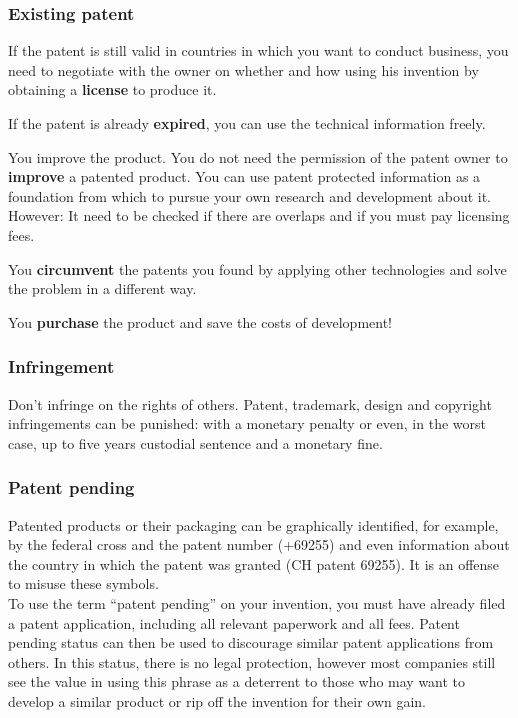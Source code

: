 \subsubsection{Existing patent}
\begin{compactitem}
	\item If the patent is still valid in countries in which you want to conduct business, you need to negotiate with the owner on whether and how using his invention by obtaining a \textbf{license} to produce it.
	\item If the patent is already \textbf{expired}, you can use the technical information freely.
	\item You improve the product. You do not need the permission of the patent
	owner to \textbf{improve} a patented product. You can use patent protected information as a foundation from which to pursue your own research and development about it. However: It need to be checked if there are overlaps and if you must pay licensing fees.
	\item You \textbf{circumvent} the patents you found by applying other technologies and solve the problem in a different way.
	\item You \textbf{purchase} the product and save the costs of development!
\end{compactitem}

\subsubsection{Infringement}
Don’t infringe on the rights of others. Patent, trademark, design and copyright infringements can be punished: with a monetary penalty or even, in the worst case, up to five years custodial sentence and a monetary fine.

\subsubsection{Patent pending}
Patented products or their packaging can be graphically identified, for example, by the federal cross and the patent number (+69255) and even information about the country in which the patent was granted (CH patent 69255). It is an offense to misuse these symbols. \\
To use the term “patent pending” on your invention, you must have already filed a patent application, including all relevant paperwork and all fees. Patent pending status can then be used to discourage similar patent applications from others. In this status, there is no legal protection, however most companies still see the value in using this phrase as a deterrent to those who may want to develop a similar product or rip off the invention for their own gain.

